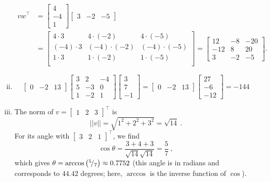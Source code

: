 \begin{example}
\begin{enumerate}[(i)]
	\begin{equation*}
	\begin{split}
v w^\top &= \begin{bmatrix} 4 \\ -4 \\ 1 \end{bmatrix} 
\begin{bmatrix} 3 & -2 & -5\end{bmatrix} \\ &= \begin{bmatrix}
4 \cdot 3 & 4 \cdot (-2) & 4 \cdot (-5) \\
(-4) \cdot 3 & (-4) \cdot (-2) & (-4) \cdot (-5) \\
1 \cdot 3 & 1 \cdot (-2) & 1 \cdot (-5) \\
\end{bmatrix} = \begin{bmatrix}
12 & -8 & -20 \\ -12 & 8 & 20 \\ 3 & -2 & -5 
\end{bmatrix}.
	\end{split}
	\end{equation*}
	\item 
	\[ \begin{bmatrix}
	0 & -2 & 13
	\end{bmatrix} \begin{bmatrix}
	3 & 2 & -4 \\ 5 & -3 & 0 \\ 1 & -2 & 1
	\end{bmatrix} \begin{bmatrix}
	3 \\ 7 \\ -1
	\end{bmatrix} = \begin{bmatrix}
	0 & -2 & 13	
	\end{bmatrix} \begin{bmatrix}
	27 \\ -6 \\ -12
	\end{bmatrix} = -144 \]
	\item The norm of $v=\begin{bmatrix}1 & 2 & 3\end{bmatrix}^\top$ is
	\[ ||v|| = \sqrt{1^2+2^2+3^2} = \sqrt{14} \:. \]
	For its angle with $\begin{bmatrix}3 & 2 & 1\end{bmatrix}^\top$, we find
	\[ \cos \theta = \frac{3+4+3}{\sqrt{14}\sqrt{14}} = \frac57 \:, \]
	which gives $\theta = \arccos \left({}^{5}\!/_{7}\right) \approx 0.7752$ (this angle is in radians and corresponds to $44.42$ degrees; here, $\arccos$ is the inverse function of $\cos$).
\end{enumerate}
\end{example}

